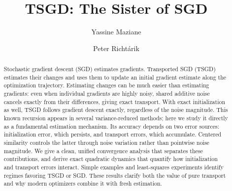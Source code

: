\documentclass[11pt]{article}
\title{TSGD: The Sister of SGD}
\author{Yassine Maziane \and Peter Richt\'arik}
\date{}
\begin{document}
\maketitle

\begin{abstract}
Stochastic gradient descent (SGD) estimates gradients. Transported SGD
(TSGD) estimates their changes and uses them to update an initial gradient
estimate along the optimization trajectory. Estimating changes can be
much easier than estimating gradients: even when individual gradients
are highly noisy, shared additive noise cancels exactly from their
differences, giving exact transport. With exact initialization as well,
TSGD follows gradient descent exactly, regardless of the noise magnitude.
This known recursion appears in several variance-reduced methods; here
we study it directly as a fundamental estimation mechanism.
Its accuracy depends on two error sources: initialization error,
which persists, and transport errors, which accumulate. Centered
similarity controls the latter through noise variation rather than
pointwise noise magnitude. We give a clean, unified convergence analysis
that separates these contributions, and derive exact quadratic dynamics
that quantify how initialization and transport errors interact.
Simple examples and least-squares experiments identify regimes
favoring TSGD or SGD. These results clarify both the value of pure
transport and why modern optimizers combine it with fresh estimation.
\end{abstract}







\label{main-text-end}

\clearpage



\appendix






\end{document}
